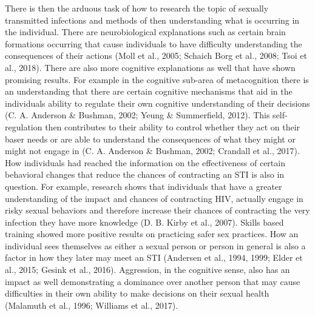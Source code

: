 \documentclass[
  donotrepeattitle,doc, 12pt, a4paper,floatsintext]{apa7}
\begin{document}
There is then the arduous task of how to research the topic of sexually transmitted infections and methods of then understanding what is occurring in the individual. There are neurobiological explanations such as certain brain formations occurring that cause individuals to have difficulty understanding the consequences of their actions (Moll et al., 2005; Schaich Borg et al., 2008; Tsoi et al., 2018). There are also more cognitive explanations as well that have shown promising results. For example in the cognitive sub-area of metacognition there is an understanding that there are certain cognitive mechanisms that aid in the individuals ability to regulate their own cognitive understanding of their decisions (C. A. Anderson \& Bushman, 2002; Yeung \& Summerfield, 2012). This self-regulation then contributes to their ability to control whether they act on their baser needs or are able to understand the consequences of what they might or might not engage in (C. A. Anderson \& Bushman, 2002; Crandall et al., 2017). How individuals had reached the information on the effectiveness of certain behavioral changes that reduce the chances of contracting an STI is also in question. For example, research shows that individuals that have a greater understanding of the impact and chances of contracting HIV, actually engage in risky sexual behaviors and therefore increase their chances of contracting the very infection they have more knowledge (D. B. Kirby et al., 2007). Skills based training showed more positive results on practicing safer sex practices. How an individual sees themselves as either a sexual person or person in general is also a factor in how they later may meet an STI (Andersen et al., 1994, 1999; Elder et al., 2015; Gesink et al., 2016). Aggression, in the cognitive sense, also has an impact as well demonstrating a dominance over another person that may cause difficulties in their own ability to make decisions on their sexual health (Malamuth et al., 1996; Williams et al., 2017).
\end{document}
